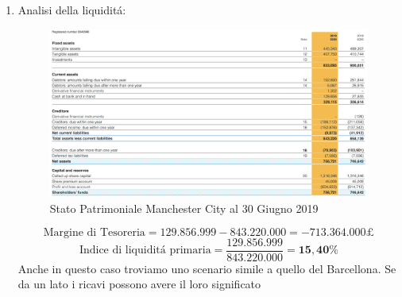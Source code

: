 \documentclass[
    corpo=12pt,
    oneside,
    evenboxes,
    tipotesi=triennale,
    stile=classica,
    oldstyle,
    autoretitolo,
    greek,
]{toptesi}
\begin{document}
\begin{interlinea}{1.5}
\begin{enumerate}
        \begin{equation}
            \frac{\text{Ricavi commerciali}}{\text{Totale Ricavi}} = \frac{228.833.000}{535.169.000} = \mathbf{42,75\%}
            \label{eqn: commerc_city}
        \end{equation}
        Dal punto di vista dei ricavi, la societ\'a pu\'o giovare di due grandi propriet\'a del calcio inglese: essere uno dei campionati
        pi\'u seguiti al mondo e di conseguenza avere fan in giro per il mondo che contribuiscono all'acquisto dei prodotti de club. Per questo 
        motivo i ricavi commerciali e quelli da diritti tv sono molto elevati e compongono la quota maggiore sul totale. I ricavi da gare
        rimangono in percentuale stabili.\newpage
    \item Analisi della liquidit\'a:\newline
        \begin{figure}
            \centering
            \includegraphics[scale=.4]{img/SP_city.png}
            \caption{Stato Patrimoniale Manchester City al 30 Giugno 2019}
            \label{sp_city}
        \end{figure}\newline
        \begin{equation}
                \text{Margine di Tesoreria} = 129.856.999 - 843.220.000 = \mathbf{-713.364.000\pounds}
            \label{eqn: marg_teso_city}
        \end{equation}
        \begin{equation}
                \text{Indice di liquidit\'a primaria} = \frac{129.856.999}{843.220.000} = \mathbf{15,40\%}
            \label{eqn: ind_liq_city}
        \end{equation}
        Anche in questo caso troviamo uno scenario simile a quello del Barcellona. Se da un lato i ricavi possono avere il loro significato 

\end{enumerate}
\end{interlinea}
\end{document}
